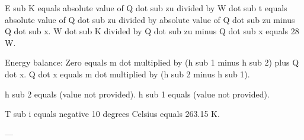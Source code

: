 E sub K equals absolute value of Q dot sub zu divided by W dot sub t equals absolute value of Q dot sub zu divided by absolute value of Q dot sub zu minus Q dot sub x.  
W dot sub K divided by Q dot sub zu minus Q dot sub x equals 28 W.  

Energy balance:  
Zero equals m dot multiplied by (h sub 1 minus h sub 2) plus Q dot x.  
Q dot x equals m dot multiplied by (h sub 2 minus h sub 1).  

h sub 2 equals (value not provided).  
h sub 1 equals (value not provided).  

T sub i equals negative 10 degrees Celsius equals 263.15 K.  

---